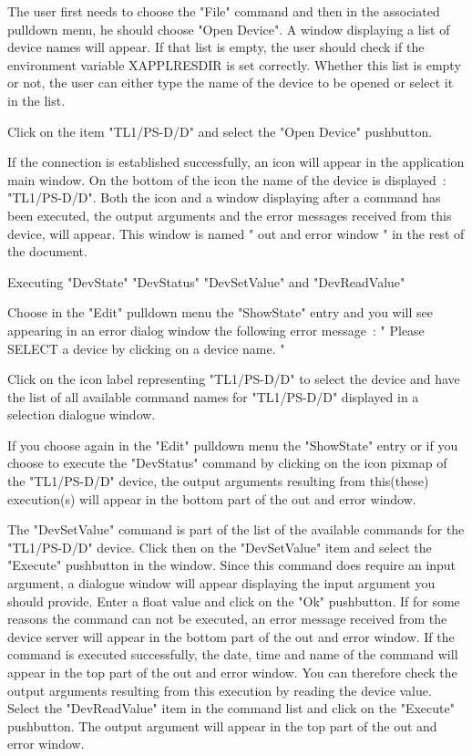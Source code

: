 The user first needs to choose the "File" command and then in the associated
pulldown menu, he should choose "Open Device". 
A window displaying a list of device names will appear. If that list is empty,  
the user should check if the environment variable XAPPLRESDIR is set correctly.
 Whether this list is empty or not, the user can either type the name of the  
device to be opened or select it in the list.

Click on the item "TL1/PS-D/D" and select the "Open Device"
pushbutton.

If the connection is established successfully, an icon will appear in the
application main window. On the bottom of the icon the name of the device is
displayed~: "TL1/PS-D/D". Both the icon and a window displaying 
after a command has been executed, the output 
arguments and the error messages received from this device, will appear. This 
window is named " out and error window " in the rest of the document.


	{Executing "DevState" "DevStatus" "DevSetValue" and 
"DevReadValue"}

Choose in the "Edit" pulldown menu the "ShowState" entry and you will see 
appearing in an error dialog window the following error message~:
" Please SELECT a device by clicking on a device name. "

Click on the icon label representing "TL1/PS-D/D" to select the device 
and have the list of all available
command names for "TL1/PS-D/D" displayed in a selection dialogue window.

If you choose again in the "Edit" pulldown menu the "ShowState" entry or if 
you choose to execute the "DevStatus" command by clicking on the icon pixmap
of the "TL1/PS-D/D" device, the output arguments resulting from this(these) 
execution(s) will appear in the bottom part of the out and error window.

The "DevSetValue" command is part of the list of the available commands for
the "TL1/PS-D/D" device. Click then on the "DevSetValue" item and select
the "Execute" pushbutton in the window. Since this command does require 
an input argument, a dialogue window will appear displaying the input argument 
you should provide. Enter a float value and click on the "Ok" pushbutton. 
If for some reasons the command can not be executed, an error message received 
from the device server will appear in the bottom part of the out and error 
window. If the command is executed successfully, the date, time and name of the
command will appear in the top part of the out and error window. 
You can therefore check the output arguments resulting from this execution by 
reading the device value. Select the "DevReadValue" item in the command list 
and click on the "Execute" pushbutton. The output argument will appear in the 
top part of the out and error window.

